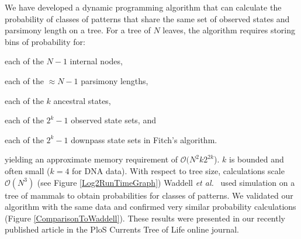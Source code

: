 \documentclass[a0paper,landscape]{baposter}
\begin{document}
\begin{poster}
{
We have developed a dynamic programming algorithm that can calculate the probability of classes of patterns that share the same set of observed states and parsimony length on a tree. For a tree of $N$ leaves, the algorithm requires storing bins of probability for:
\begin{compactitem}
	\item each of the $N-1$ internal nodes,
	\item each of the $\approx N - 1$ parsimony lengths,
	\item each of the $k$ ancestral states,
	\item  each of the $2^{k}-1$ observed state sets, and
	\item each of the $2^{k}-1$ downpass state sets in Fitch's \cite{Fitch1971} algorithm.
\end{compactitem}
yielding an approximate memory requirement of $\mathcal{O}(N^2 k 2^{2k}$).
$k$ is bounded and often small ($k=4$ for DNA data).
With respect to tree size, calculations scale $\mathcal{O}(N^3)$ (see Figure \ref{Log2RunTimeGraph})
Waddell {\em et al.~}\citep{WaddellOP2009} used simulation on a tree of mammals to obtain probabilities for classes of patterns.
We validated our algorithm with the same data and confirmed very similar probability calculations (Figure \ref{ComparisonToWaddell}).  
These results were presented in our recently published article in the PloS Currents Tree of Life online journal\cite{KochH2012}.

}
\end{poster}
\end{document}
